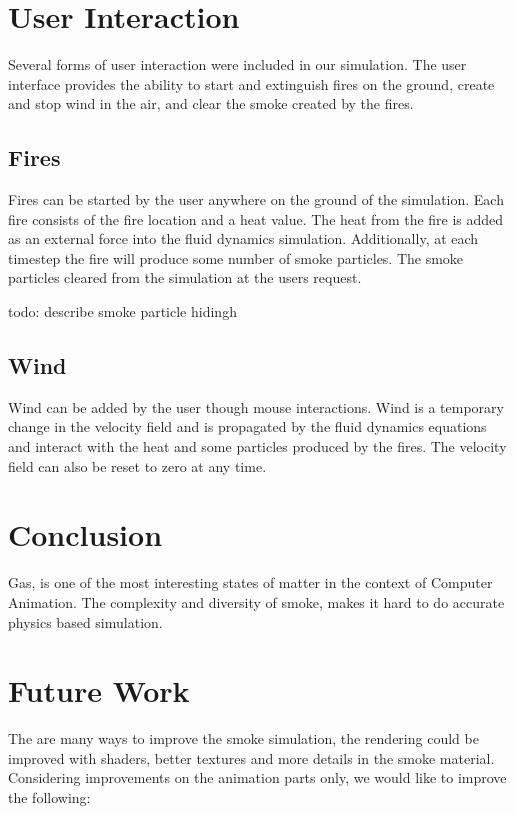 \documentclass[conference]{acmsiggraph}
\begin{document}
\section{User Interaction}

Several forms of user interaction were included in our simulation. The user
interface provides the ability to start and extinguish fires on the ground,
create and stop wind in the air, and clear the smoke created by the fires.

\subsection{Fires}

Fires can be started by the user anywhere on the ground of the simulation. Each
fire consists of the fire location and a heat value. The heat from the fire is
added as an external force into the fluid dynamics simulation. Additionally, at
each timestep the fire will produce some number of smoke particles. The smoke
particles cleared from the simulation at the users request. 

todo: describe smoke particle hidingh

\subsection{Wind}

Wind can be added by the user though mouse interactions. Wind is a temporary
change in the velocity field and is propagated by the fluid dynamics equations
and interact with the heat and some particles produced by the fires. The
velocity field can also be reset to zero at any time.

\section{Conclusion}

Gas, is one of the most interesting states of matter in the context of Computer
Animation. The complexity and diversity of smoke, makes it hard to do accurate
physics based simulation. 

\section{Future Work}

The are many ways to improve the smoke simulation, the rendering could be
improved with shaders, better textures and more details in the smoke material.
Considering improvements on the animation parts only, we would like to improve
the following:
\end{document}

